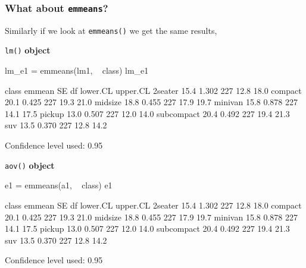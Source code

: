 \documentclass[a4paper]{article}\usepackage[]{graphicx}\usepackage[]{xcolor}
\begin{document}
\subsubsection{What about \lstinline|emmeans|?}
Similarly if we look at \lstinline|emmeans()| we get the same results,\\
\begin{minipage}[t]{0.49\textwidth}
\lstinline|lm()| \textbf{object}
\begin{Schunk}
\begin{Sinput}
lm_e1 = emmeans(lm1, ~ class)
lm_e1
\end{Sinput}
\begin{Soutput}
 class      emmean    SE  df lower.CL upper.CL
 2seater      15.4 1.302 227     12.8     18.0
 compact      20.1 0.425 227     19.3     21.0
 midsize      18.8 0.455 227     17.9     19.7
 minivan      15.8 0.878 227     14.1     17.5
 pickup       13.0 0.507 227     12.0     14.0
 subcompact   20.4 0.492 227     19.4     21.3
 suv          13.5 0.370 227     12.8     14.2

Confidence level used: 0.95 
\end{Soutput}
\end{Schunk}
\end{minipage}
\hspace{0.02\textwidth}
\begin{minipage}[t]{0.49\textwidth}
\lstinline|aov()| \textbf{object}
\begin{Schunk}
\begin{Sinput}
e1 = emmeans(a1, ~ class)
e1
\end{Sinput}
\begin{Soutput}
 class      emmean    SE  df lower.CL upper.CL
 2seater      15.4 1.302 227     12.8     18.0
 compact      20.1 0.425 227     19.3     21.0
 midsize      18.8 0.455 227     17.9     19.7
 minivan      15.8 0.878 227     14.1     17.5
 pickup       13.0 0.507 227     12.0     14.0
 subcompact   20.4 0.492 227     19.4     21.3
 suv          13.5 0.370 227     12.8     14.2

Confidence level used: 0.95 
\end{Soutput}
\end{Schunk}
\end{minipage}
\end{document}
